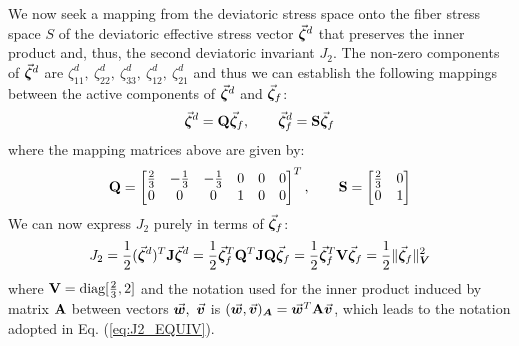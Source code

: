 We now seek a mapping from the deviatoric stress space onto the fiber stress 
space $S$ of the deviatoric
effective stress vector $\vec{\boldsymbol{\zeta}}^d$ that preserves the inner product and, 
thus, the second deviatoric invariant $J_2$. The non-zero components of 
$\vec{\boldsymbol{\zeta}}^d$ are $\zeta_{11}^d,\ \zeta_{22}^d,\ \zeta_{33}^d,\
\zeta_{12}^d,\ \zeta_{21}^d$ and thus we can establish the following mappings
between the active components of $\vec{\boldsymbol{\zeta}}^d$ and $\vec{\boldsymbol{\zeta}}_f$:
\begin{equation}
	\vec{\boldsymbol{\zeta}}^d = \mathbf{Q}\vec{\boldsymbol{\zeta}}_f,\qquad \vec{\boldsymbol{\zeta}}^d_f =
	\mathbf{S}\vec{\boldsymbol{\zeta}}_f
	\label{eq:MAPPING}
\end{equation}
where the mapping matrices above are given by:
\begin{equation}
	\mathbf{Q} = \begin{bmatrix}
		\frac{2}{3} & -\frac{1}{3} & -\frac{1}{3} & 0 & 0 & 0 \\
		0 & 0 & 0 & 1 & 0 & 0
	\end{bmatrix}^T,\qquad \mathbf{S} = \begin{bmatrix}
		\frac{2}{3} & 0\\
		0 & 1
	\end{bmatrix}
	\label{eq:MAPPING_MATRIX}
\end{equation}
We can now express $J_2$ purely in terms of $\vec{\boldsymbol{\zeta}}_f$:
\begin{equation}
	J_2 = \frac{1}{2}(\vec{\boldsymbol{\zeta}}^d)^T\mathbf{J}\vec{\boldsymbol{\zeta}}^d = 
	\frac{1}{2}\vec{\boldsymbol{\zeta}}_f^T\mathbf{Q}^T\mathbf{J}\mathbf{Q}\vec{\boldsymbol{\zeta}}_f =
	\frac{1}{2}\vec{\boldsymbol{\zeta}}_f^T\mathbf{V}\vec{\boldsymbol{\zeta}}_f = \frac{1}{2}\Vert
	\vec{\boldsymbol{\zeta}}_f\Vert^2_{\bm{V}}
	\label{eq:J2_EQUIV}
\end{equation}
where $\mathbf{V} =\text{diag}[\frac{2}{3}, 2]$ and the notation used for the 
inner product induced by matrix $\mathbf{A}$ between vectors 
$\vec{\boldsymbol{w}},\ \vec{\boldsymbol{v}}$ is $(\vec{\boldsymbol{w}},\vec{\boldsymbol{v}})_{\bm{A}} =
\vec{\boldsymbol{w}}^T\mathbf{A}\vec{\boldsymbol{v}}$, which leads to the notation adopted in Eq. 
(\ref{eq:J2_EQUIV}).


